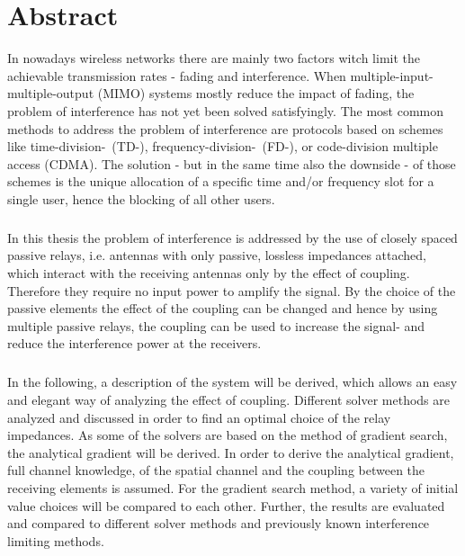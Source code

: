 \chapter*{Abstract}

In nowadays wireless networks there are mainly two factors witch limit the achievable transmission rates - fading and interference.
When multiple-input-multiple-output (MIMO) systems mostly reduce the impact of fading, the problem of interference has not yet been solved satisfyingly.
The most common methods to address the problem of interference are protocols based on schemes like time-division-~(TD-), frequency-division-~(FD-), or code-division multiple access (CDMA).
The solution - but in the same time also the downside - of those schemes is the unique allocation of a specific time and/or frequency slot for a single user, hence the blocking of all other users.
\paragraph{}
In this thesis the problem of interference is addressed by the use of closely spaced passive relays, i.e. antennas with only passive, lossless impedances attached, which interact with the receiving antennas only by the effect of coupling.
Therefore they require no input power to amplify the signal.
By the choice of the passive elements the effect of the coupling can be changed and hence by using multiple passive relays, the coupling can be used to increase the signal- and reduce the interference power at the receivers.
\paragraph{}
In the following, a description of the system will be derived, which allows an easy and elegant way of analyzing the effect of coupling.
Different solver methods are analyzed and discussed in order to find an optimal choice of the relay impedances.
As some of the solvers are based on the method of gradient search, the analytical gradient will be derived.
In order to derive the analytical gradient, full channel knowledge, of the spatial channel and the coupling between the receiving elements is assumed.
For the gradient search method, a variety of initial value choices will be compared to each other.
Further, the results are evaluated and compared to different solver methods and previously known interference limiting methods.
